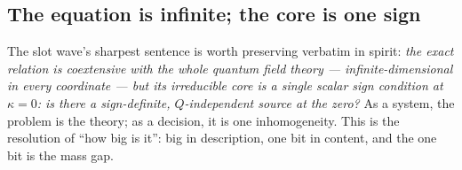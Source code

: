\figfunnel

\subsection{The equation is infinite; the core is one sign}

The slot wave's sharpest sentence is worth preserving verbatim in spirit: \emph{the exact
relation is coextensive with the whole quantum field theory --- infinite-dimensional in every
coordinate --- but its irreducible core is a single scalar sign condition at $\kappa=0$: is there
a sign-definite, $Q$-independent source at the zero?} As a system, the problem is the theory; as
a decision, it is one inhomogeneity. This is the resolution of ``how big is it'': big in
description, one bit in content, and the one bit is the mass gap.
